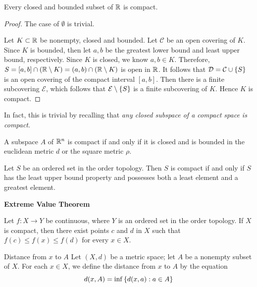 \documentclass[12pt,a4paper]{article}
\begin{document}
    \begin{cor}
        Every closed and bounded subset of $\mathbb{R}$ is compact.
    \end{cor}
    \begin{proof}
        The case of $\emptyset$ is trivial.
        
        Let $K\subset\mathbb{R}$ be nonempty, closed and bounded. Let $\mathcal{C}$ be an open covering of $K$. Since $K$ is bounded, then let $a,b$ be the greatest lower bound and least upper bound, respectively. Since $K$ is closed, we know $a,b\in K$. Therefore, $S=[a,b]\cap(\mathbb{R}\setminus K)=(a,b)\cap(\mathbb{R}\setminus K)$ is open in $\mathbb{R}$. It follows that $\mathcal{D}=\mathcal{C}\cup\left\{S\right\}$ is an open covering of the compact interval $[a,b]$. Then there is a finite subcovering $\mathcal{E}$, which follows that $\mathcal{E}\setminus\left\{S\right\}$ is a finite subcovering of $K$. Hence $K$ is compact.
    \end{proof}
    \begin{remark}
        In fact, this is trivial by recalling that \textit{any closed subspace of a compact space is compact}.
    \end{remark}
    \hfill

    \begin{thm}
        A subspace $A$ of $\mathbb{R}^n$ is compact if and only if it is closed and is bounded in the euclidean metric $d$ or the square metric $\rho$.
    \end{thm}
    \hfill

    \begin{thm}
        Let $S$ be an ordered set in the order topology. Then $S$ is compact if and only if $S$ has the least upper bound property and possesses both a least element and a greatest element.
    \end{thm}

    \begin{thm}\textbf{{Extreme Value Theorem}}\hfill

        Let $f:X\to Y$ be continuous, where $Y$ is an ordered set in the order topology. If $X$ is compact, then there exist points $c$ and $d$ in $X$ such that $f(c)\leq f(x)\leq f(d)$ for every $x\in X$.
    \end{thm}
    \hfill

    \begin{defi}{Distance from $x$ to $A$}
        Let $(X,d)$ be a metric space; let $A$ be a nonempty subset of $X$. For each $x\in X$, we define the distance from $x$ to $A$ by the equation
        $$
        d(x,A)=\inf\left\{d(x,a):a\in A\right\}
        $$
    \end{defi}
    \hfill
\end{document}

